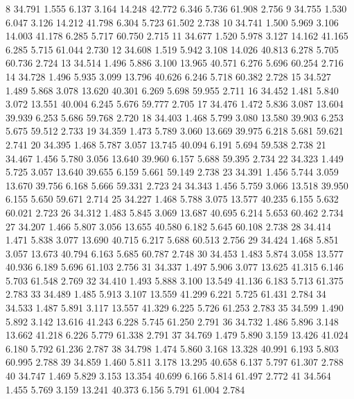 \documentclass[a4paper,11pt]{scrartcl}
\begin{document}
\begin{Schunk}
\begin{Soutput}
8  34.791  1.555  6.137  3.164 14.248   42.772  6.346  5.736   61.908  2.756
9  34.755  1.530  6.047  3.126 14.212   41.798  6.304  5.723   61.502  2.738
10 34.741  1.500  5.969  3.106 14.003   41.178  6.285  5.717   60.750  2.715
11 34.677  1.520  5.978  3.127 14.162   41.165  6.285  5.715   61.044  2.730
12 34.608  1.519  5.942  3.108 14.026   40.813  6.278  5.705   60.736  2.724
13 34.514  1.496  5.886  3.100 13.965   40.571  6.276  5.696   60.254  2.716
14 34.728  1.496  5.935  3.099 13.796   40.626  6.246  5.718   60.382  2.728
15 34.527  1.489  5.868  3.078 13.620   40.301  6.269  5.698   59.955  2.711
16 34.452  1.481  5.840  3.072 13.551   40.004  6.245  5.676   59.777  2.705
17 34.476  1.472  5.836  3.087 13.604   39.939  6.253  5.686   59.768  2.720
18 34.403  1.468  5.799  3.080 13.580   39.903  6.253  5.675   59.512  2.733
19 34.359  1.473  5.789  3.060 13.669   39.975  6.218  5.681   59.621  2.741
20 34.395  1.468  5.787  3.057 13.745   40.094  6.191  5.694   59.538  2.738
21 34.467  1.456  5.780  3.056 13.640   39.960  6.157  5.688   59.395  2.734
22 34.323  1.449  5.725  3.057 13.640   39.655  6.159  5.661   59.149  2.738
23 34.391  1.456  5.744  3.059 13.670   39.756  6.168  5.666   59.331  2.723
24 34.343  1.456  5.759  3.066 13.518   39.950  6.155  5.650   59.671  2.714
25 34.227  1.468  5.788  3.075 13.577   40.235  6.155  5.632   60.021  2.723
26 34.312  1.483  5.845  3.069 13.687   40.695  6.214  5.653   60.462  2.734
27 34.207  1.466  5.807  3.056 13.655   40.580  6.182  5.645   60.108  2.738
28 34.414  1.471  5.838  3.077 13.690   40.715  6.217  5.688   60.513  2.756
29 34.424  1.468  5.851  3.057 13.673   40.794  6.163  5.685   60.787  2.748
30 34.453  1.483  5.874  3.058 13.577   40.936  6.189  5.696   61.103  2.756
31 34.337  1.497  5.906  3.077 13.625   41.315  6.146  5.703   61.548  2.769
32 34.410  1.493  5.888  3.100 13.549   41.136  6.183  5.713   61.375  2.783
33 34.489  1.485  5.913  3.107 13.559   41.299  6.221  5.725   61.431  2.784
34 34.533  1.487  5.891  3.117 13.557   41.329  6.225  5.726   61.253  2.783
35 34.599  1.490  5.892  3.142 13.616   41.243  6.228  5.745   61.250  2.791
36 34.732  1.486  5.896  3.148 13.662   41.218  6.226  5.779   61.338  2.791
37 34.769  1.479  5.890  3.159 13.426   41.024  6.180  5.792   61.236  2.787
38 34.798  1.474  5.860  3.168 13.328   40.991  6.193  5.803   60.995  2.788
39 34.859  1.460  5.811  3.178 13.295   40.658  6.137  5.797   61.307  2.788
40 34.747  1.469  5.829  3.153 13.354   40.699  6.166  5.814   61.497  2.772
41 34.564  1.455  5.769  3.159 13.241   40.373  6.156  5.791   61.004  2.784

\end{Soutput}
\end{Schunk}
\end{document}
